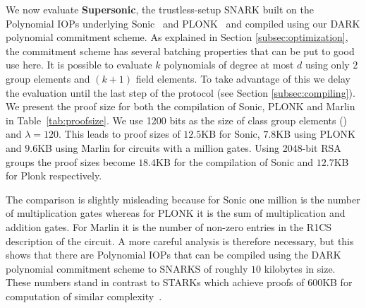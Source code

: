 We now evaluate \textsf{\textbf{Supersonic}}, the trustless-setup SNARK built on the Polynomial IOPs underlying \textsf{Sonic}~\cite{Sonic} and \textsf{PLONK}~\cite{Plonk} and compiled using our DARK polynomial commitment scheme. As explained in Section \ref{subsec:optimization}, the commitment scheme has several batching properties that can be put to good use here. It is possible to evaluate $k$ polynomials of degree at most $d$ using only $2$ group elements and $(k+1)$ field elements. To take advantage of this we delay the evaluation until the last step of the protocol (see Section \ref{subsec:compiling}). We present the proof size for both the compilation of \textsf{Sonic}, \textsf{PLONK} and \textsf{Marlin} in Table~\ref{tab:proofsize}. We use 1200 bits as the size of class group elements (\cite{PKC/BucHam01}) and $\lambda=120$. This leads to proof sizes of $12.5$KB for \textsf{Sonic}, $7.8$KB using \textsf{PLONK} and $9.6$KB using \textsf{Marlin} for circuits with a million gates. Using 2048-bit RSA groups the proof sizes become $18.4$KB for the compilation of Sonic and $12.7$KB for Plonk respectively. 

The comparison is slightly misleading because for \textsf{Sonic} one million is the number of multiplication gates whereas for \textsf{PLONK} it is the sum of multiplication and addition gates. For \textsf{Marlin} it is the number of non-zero entries in the R1CS description of the circuit. A more careful analysis is therefore necessary, but this shows that there are Polynomial IOPs that can be compiled using the DARK polynomial commitment scheme to SNARKS of roughly $10$ kilobytes in size. These numbers stand in contrast to \textsf{STARK}s which achieve proofs of $600$KB for computation of similar complexity~\cite{C:BBHR19}. 
\vspace{-1em}

